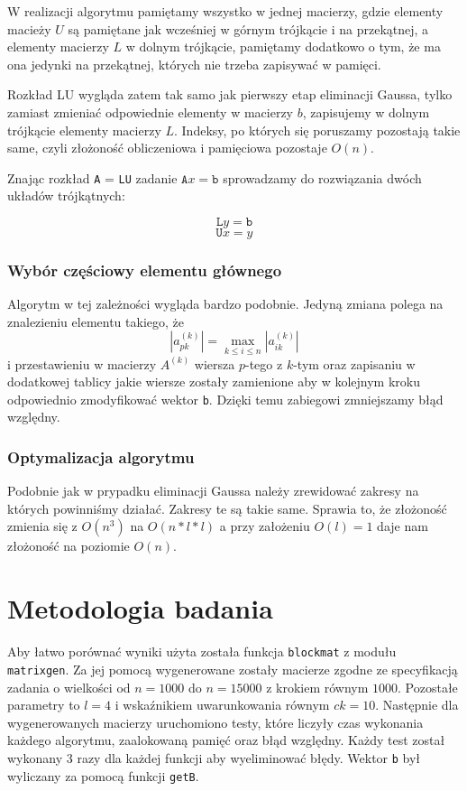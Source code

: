 \documentclass{article}
\begin{document}
\begin{itemize}
W realizacji algorytmu pamiętamy wszystko w jednej macierzy, gdzie elementy macieży $U$ są pamiętane jak wcześniej w górnym trójkącie i na przekątnej, a elementy macierzy $L$ w dolnym trójkącie, pamiętamy dodatkowo o tym, że ma ona jedynki na przekątnej, których nie trzeba zapisywać w pamięci.
\par
Rozkład LU wygląda zatem tak samo jak pierwszy etap eliminacji Gaussa, tylko zamiast zmieniać odpowiednie elementy w macierzy $b$, zapisujemy w dolnym trójkącie elementy macierzy $L$. Indeksy, po których się poruszamy pozostają takie same, czyli złożoność obliczeniowa i pamięciowa pozostaje $O(n)$.

Znając rozkład \texttt{A} = \texttt{LU} zadanie $\texttt{A}x = \texttt{b}$ sprowadzamy do
rozwiązania dwóch układów trójkątnych:
\par
\[
\texttt{L}y = \texttt{b}
\]
\[
\texttt{U}x = y
\]


\subsubsection*{Wybór częściowy elementu głównego}
Algorytm w tej zależności wygląda bardzo podobnie. Jedyną zmiana polega na znalezieniu elementu takiego, że
\[ |a_{pk}^{(k)}| = \max_{k \leq i \leq n} |a_{ik}^{(k)}| \]
i przestawieniu w macierzy $A^{(k)}$ wiersza $p$-tego z $k$-tym oraz zapisaniu w dodatkowej tablicy jakie wiersze zostały zamienione aby w kolejnym kroku odpowiednio zmodyfikować wektor \texttt{b}. Dzięki temu zabiegowi zmniejszamy błąd względny.
\subsubsection*{Optymalizacja algorytmu}
Podobnie jak w prypadku eliminacji Gaussa należy  zrewidować zakresy na których powinniśmy działać. Zakresy te są takie same. Sprawia to, że złożoność zmienia się z $O(n^3)$ na $O(n*l*l)$ a przy założeniu $O(l)=1$ daje nam złożoność na poziomie $O(n)$. 

\section*{Metodologia badania}
Aby łatwo porównać wyniki użyta została funkcja \texttt{blockmat} z modułu \texttt{matrixgen}. Za jej pomocą wygenerowane zostały macierze zgodne ze specyfikacją zadania o wielkości od $n=1000$ do $n=15000$ z krokiem równym $1000$. Pozostałe parametry to $l=4$ i wskaźnikiem uwarunkowania równym $ck=10$. Następnie dla wygenerowanych macierzy uruchomiono testy, które liczyły czas wykonania każdego algorytmu, zaalokowaną pamięć oraz błąd względny. Każdy test został wykonany 3 razy dla każdej funkcji aby wyeliminować błędy. Wektor \texttt{b} był wyliczany za pomocą funkcji \texttt{getB}.


\end{itemize}
\end{document}
